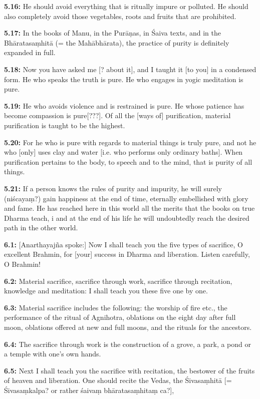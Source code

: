 \documentclass{article}
\newcommand{\vsnum}[1]{\textbf{#1}}
\begin{document}
\vsnum{5.16: }He should avoid everything that is ritually impure or polluted. He should also completely avoid those vegetables, roots and fruits that are prohibited.

\vsnum{5.17: }In the books of Manu, in the Purāṇas, in Śaiva texts, and in the Bhāratasaṃhitā (= the Mahābhārata), the practice of purity is definitely expanded in full.

\vsnum{5.18: }Now you have asked me [? about it], and I taught it [to you] in a condensed form. He who speaks the truth is pure. He who engages in yogic meditation is pure.

\vsnum{5.19: }He who avoids violence and is restrained is pure. He whose patience has become compassion is pure[???]. Of all the [ways of] purification, material purification is taught to be the highest.

\vsnum{5.20: }For he who is pure with regards to material things is truly pure, and not he who [only] uses clay and water [i.e. who performs only ordinary baths]. When purification pertains to the body, to speech and to the mind, that is purity of all things.

\vsnum{5.21: }If a person knows the rules of purity and impurity, he will surely (niścayaṃ?) gain happiness at the end of time, eternally embellished with glory and fame. He has reached here in this world all the merits that the books on true Dharma teach, i and at the end of his life he will undoubtedly reach the desired path in the other world.


\vsnum{6.1: }[Anarthayajña spoke:] Now I shall teach you the five types of sacrifice, O excellent Brahmin, for [your] success in Dharma and liberation. Listen carefully, O Brahmin! 

\vsnum{6.2: }Material sacrifice, sacrifice through work, sacrifice through recitation, knowledge and meditation: I shall teach you these five one by one.

\vsnum{6.3: }Material sacrifice includes the following: the worship of fire etc., the performance of the ritual of Agnihotra, oblations on the eight day after full moon, oblations offered at new and full moons, and the rituals for the ancestors.

\vsnum{6.4: }The sacrifice through work is the construction of a grove, a park, a pond or a temple with one's own hands.

\vsnum{6.5: }Next I shall teach you the sacrifice with recitation, the bestower of the fruits of heaven and liberation. One should recite the Vedas, the Śivasaṃhitā [= Śivasaṃkalpa? or rather śaivaṃ bhāratasaṃhitaṃ ca?],
\end{document}
